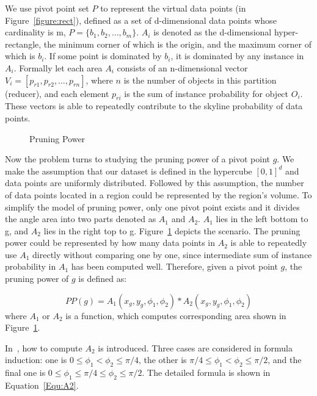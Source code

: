 We use pivot point set $P$ to represent the virtual data points (in Figure~\ref{figure:rect}), defined as a set of d-dimensional data points whose cardinality is m, $P=\{b_1, b_2, \dots, b_m\}$. $A_i$ is denoted as the d-dimensional hyper-rectangle, the minimum corner of which is the origin, and the maximum corner of which is $b_i$. If some point is dominated by $b_i$, it is dominated by any instance in $A_i$. Formally let each area $A_i$ consists of an n-dimensional vector $V_i = [p_{r1}, p_{r2}, \dots, p_{rn}]$, where $n$ is the number of objects in this partition (reducer), and each element $p_{ri}$ is the sum of instance probability for object $O_i$. These vectors is able to repeatedly contribute to the skyline probability of data points.  


\begin{figure}[t]
\vspace{-15pt}
\centering
  \centerline{}
  \caption{Pruning Power}
  \vspace{-15pt}
  \label{figure:A1A2}
\end{figure}

Now the problem turns to studying the pruning power of a pivot point $g$. We make the assumption that our dataset is defined in the hypercube $[0,1]^d$ and data points are uniformly distributed. Followed by this assumption, the number of data points located in a region could be represented by the region's volume. To simplify the model of pruning power, only one pivot point exists and it divides the angle area into two parts denoted as $A_1$ and $A_2$. $A_1$ lies in the left bottom to g, and $A_2$ lies in the right top to g. Figure~\ref{figure:A1A2} depicts the scenario. The pruning power could be represented by how many data points in $A_2$ is able to repeatedly use $A_1$ directly without comparing one by one, since intermediate sum of instance probability in $A_1$ has been computed well. Therefore, given a pivot point $g$, the pruning power of $g$ is defined as:

\begin{equation}
PP(g) = A_1(x_g, y_g, \phi_1, \phi_2) * A_2(x_g, y_g, \phi_1, \phi_2)
\end{equation}
where $A_1$ or $A_2$ is a function, which computes corresponding area shown in Figure~\ref{figure:A1A2}.

In~\cite{ref:AngularPartition}, how to compute $A_2$ is introduced. Three cases are considered in formula induction: one is $0 \leq \phi_1 < \phi_2 \leq \pi/4$, the other is $\pi/4 \leq \phi_1 < \phi_2 \leq \pi/2$, and the final one is $0 \leq \phi_1 \leq \pi/4 \le \phi_2 \leq \pi/2$. The detailed formula is shown in Equation~\ref{Equ:A2}.

